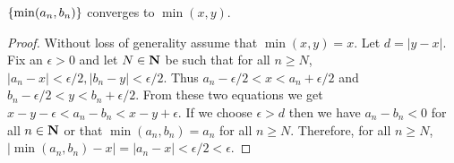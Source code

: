 \begin{lem}\label{c5s1l8}
$\{\min(a_n, b_n)\}$ converges to $\min(x, y)$.
\end{lem}
\begin{proof}
Without loss of generality assume that $\min(x, y) = x$. Let $d = |y - x|$. 
Fix an $\epsilon > 0$ and let $N \in \mathbf{N}$ be such that for all $n \ge N$,
$|a_n - x| < \epsilon/2, |b_n - y| < \epsilon/2$. Thus $a_n - \epsilon/2 < 
x < a_n + \epsilon/2$ and $b_n - \epsilon/2 < y < b_n + \epsilon/2$. From
these two equations we get $x - y - \epsilon < a_n - b_n < x - y + \epsilon$.
If we choose $\epsilon > d$ then we have $a_n - b_n < 0$ for all $n \in 
\mathbf{N}$ or that $\min(a_n, b_n) = a_n$ for all $n \ge N$. Therefore, for 
all $n \ge N$, $|\min(a_n, b_n) - x| = |a_n - x| < \epsilon/2 < \epsilon$.
\end{proof}

